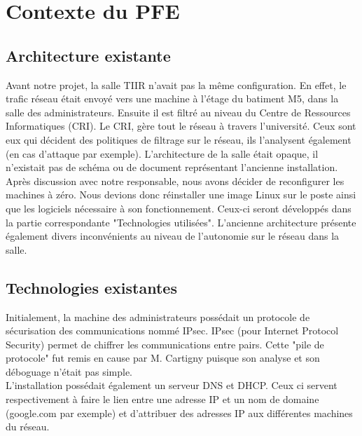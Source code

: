 \chapter{Contexte du PFE}
\label{chap:premierchapitre}

\section{Architecture existante}
Avant notre projet, la salle TIIR n'avait pas la même configuration. En effet, le trafic réseau était envoyé vers une machine à l'étage du batiment M5, dans la salle des administrateurs. Ensuite il est filtré au niveau du Centre de Ressources Informatiques (CRI). Le CRI, gère tout le réseau à travers l'université. Ceux sont eux qui décident des politiques de filtrage sur le réseau, ils l'analysent également (en cas d'attaque par exemple). L'architecture de la salle était opaque, il n'existait pas de schéma ou de document représentant l'ancienne installation. Après discussion avec notre responsable, nous avons décider de reconfigurer les machines à zéro. Nous devions donc réinstaller une image Linux sur le poste ainsi que les logiciels nécessaire à son fonctionnement. Ceux-ci seront développés dans la partie correspondante "Technologies utilisées". L'ancienne architecture présente également divers inconvénients au niveau de l'autonomie sur le réseau dans la salle. 

\section{Technologies existantes}
Initialement, la machine des administrateurs possédait un protocole de sécurisation des communications nommé IPsec. IPsec (pour Internet Protocol Security) permet de chiffrer les communications entre pairs. Cette "pile de protocole" fut remis en cause par M. Cartigny puisque son analyse et son déboguage n'était pas simple.\\
L'installation possédait également un serveur DNS et DHCP. Ceux ci servent respectivement à faire le lien entre une adresse IP et un nom de domaine (google.com par exemple) et d'attribuer des adresses IP aux différentes machines du réseau.\\

